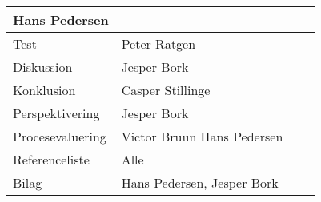 \begin{table}[h!]
\begin{tabular}{|p{45mm}|p{26mm}|p{26mm}|p{26mm}|}
                                 Hans Pedersen    &          &  \\ \hline
        Test                   & Peter Ratgen     &          &  \\ \hline
        Diskussion             & Jesper Bork      &          &  \\ \hline
        Konklusion             & Casper Stillinge &          &  \\ \hline
        Perspektivering        & Jesper Bork      &          &  \\ \hline
        Procesevaluering       & Victor Bruun \newline
                                 Hans Pedersen    &          &  \\ \hline
        Referenceliste         & Alle             &          &  \\ \hline
        Bilag                  & Hans Pedersen, Jesper Bork  &          &  \\ \hline
    \end{tabular}
\end{table}

\clearpage
